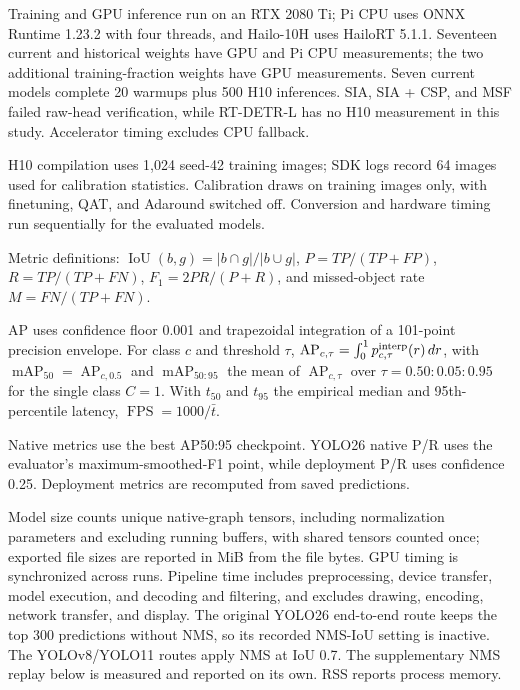\documentclass[lettersize,journal]{IEEEtran}
\begin{document}
Training and GPU inference run on an RTX 2080 Ti; Pi CPU uses ONNX Runtime 1.23.2 with four threads, and Hailo-10H uses HailoRT 5.1.1. Seventeen current and historical weights have GPU and Pi CPU measurements; the two additional training-fraction weights have GPU measurements. Seven current models complete 20 warmups plus 500 H10 inferences. SIA, SIA + CSP, and MSF failed raw-head verification, while RT-DETR-L has no H10 measurement in this study. Accelerator timing excludes CPU fallback.

H10 compilation uses 1,024 seed-42 training images; SDK logs record 64 images used for calibration statistics. Calibration draws on training images only, with finetuning, QAT, and Adaround switched off. Conversion and hardware timing run sequentially for the evaluated models.

Metric definitions: $\operatorname{IoU}(b,g)=|b\cap g|/|b\cup g|$, $P=TP/(TP+FP)$, $R=TP/(TP+FN)$, $F_1=2PR/(P+R)$, and missed-object rate $M=FN/(TP+FN)$.

AP uses confidence floor 0.001 and trapezoidal integration of a 101-point precision envelope. For class $c$ and threshold $\tau$, $\operatorname{AP}_{c,\tau}=\int_0^1p^{\rm interp}_{c,\tau}(r)\,dr$, with $\operatorname{mAP}_{50}=\operatorname{AP}_{c,0.5}$ and $\operatorname{mAP}_{50:95}$ the mean of $\operatorname{AP}_{c,\tau}$ over $\tau=0.50{:}0.05{:}0.95$ for the single class $C=1$. With $t_{50}$ and $t_{95}$ the empirical median and 95th-percentile latency, $\operatorname{FPS}=1000/\bar t$.

Native metrics use the best AP50:95 checkpoint. YOLO26 native P/R uses the evaluator's maximum-smoothed-F1 point, while deployment P/R uses confidence 0.25. Deployment metrics are recomputed from saved predictions.

Model size counts unique native-graph tensors, including normalization parameters and excluding running buffers, with shared tensors counted once; exported file sizes are reported in MiB from the file bytes. GPU timing is synchronized across runs. Pipeline time includes preprocessing, device transfer, model execution, and decoding and filtering, and excludes drawing, encoding, network transfer, and display. The original YOLO26 end-to-end route keeps the top 300 predictions without NMS, so its recorded NMS-IoU setting is inactive. The YOLOv8/YOLO11 routes apply NMS at IoU 0.7. The supplementary NMS replay below is measured and reported on its own. RSS reports process memory.
\end{document}
